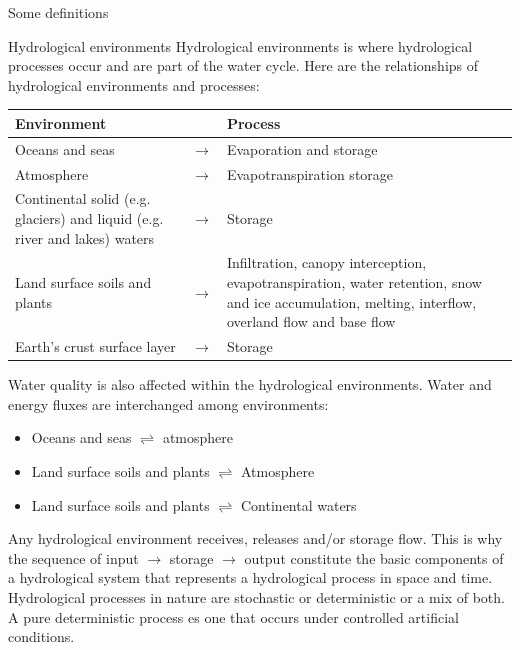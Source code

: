 \documentclass[8pt]{beamer}
\begin{document}
\begin{frame}{Some definitions}
    \begin{block}{Hydrological environments}
        Hydrological environments is where hydrological processes occur and are part of the \alert{water cycle}. Here are the relationships of hydrological environments and processes:
        \begin{tabular}{p{4cm}p{0.5cm}p{6cm}}  %
                \hline
            \alert{Environment} & & \alert{Process}  \\
                \hline
    Oceans and seas &  $\rightarrow$ & Evaporation and storage \\
    Atmosphere & $\rightarrow$ & Evapotranspiration storage \\
    Continental solid (e.g. glaciers) and liquid (e.g. river and lakes) waters & $\rightarrow$ & Storage \\
    Land surface soils and plants & $\rightarrow$ & Infiltration, canopy interception,  evapotranspiration, water retention, snow and ice accumulation, melting, interflow, overland flow and base flow \\
    Earth's crust surface layer & $\rightarrow$ & Storage
\end{tabular}
        Water quality is also affected within the hydrological environments. Water and energy fluxes are interchanged among environments:
        \begin{itemize}
            \item Oceans and seas $\rightleftharpoons$ atmosphere
            \item Land surface soils and plants $\rightleftharpoons$ Atmosphere
            \item Land surface soils and plants $\rightleftharpoons$ Continental waters 
        \end{itemize}
        Any hydrological environment \alert{receives}, \alert{releases} and/or \alert{storage} flow.  This is why the sequence of \alert{input} $\rightarrow$ \alert{storage} $\rightarrow$ \alert{output} constitute the  basic components of a \alert{hydrological system} that represents a \alert{hydrological process} in space and time. Hydrological processes in nature are \alert{stochastic} or \alert{deterministic} or a mix of both. A pure deterministic process es one that occurs under controlled artificial conditions.
    \end{block}    
\end{frame}
\end{document}
